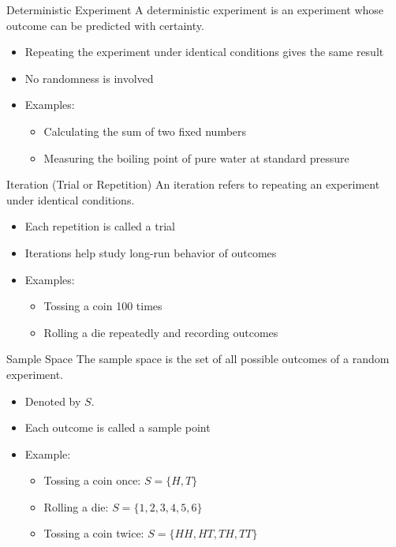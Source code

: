 \documentclass[12pt, aspectratio=169]{beamer}
\begin{document}
	\begin{frame}{Deterministic Experiment}
		A deterministic experiment is an experiment whose outcome can be predicted with certainty.
		\begin{itemize}
			\item Repeating the experiment under identical conditions gives the same result
			\item No randomness is involved
			\item Examples:
			\begin{itemize}
				\item Calculating the sum of two fixed numbers
				\item Measuring the boiling point of pure water at standard pressure
			\end{itemize}
		\end{itemize}
	\end{frame}


	\begin{frame}{Iteration (Trial or Repetition)}
	An iteration refers to repeating an experiment under identical conditions.
		\begin{itemize}
			\item Each repetition is called a trial
			\item Iterations help study long-run behavior of outcomes
			\item Examples:
			\begin{itemize}
				\item Tossing a coin 100 times
				\item Rolling a die repeatedly and recording outcomes
			\end{itemize}
		\end{itemize}
	\end{frame}


	\begin{frame}{Sample Space}
		The sample space is the set of all possible outcomes of a random experiment.
		\begin{itemize}
			\item Denoted by $S$.
			\item Each outcome is called a sample point
			\item Example:
			\begin{itemize}
				\item Tossing a coin once: \(S = \{H, T\}\)
				\item Rolling a die: \(S = \{1,2,3,4,5,6\}\)
				\item Tossing a coin twice: \(S = \{HH, HT, TH, TT\}\)
			\end{itemize}
		\end{itemize}
	\end{frame}
\end{document}
